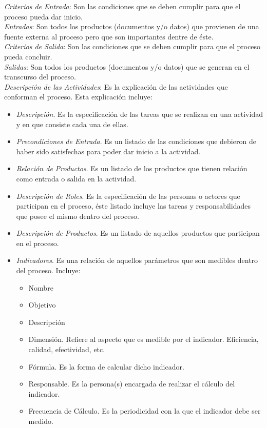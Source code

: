 \begin{footnotesize}
\textit{Criterios de Entrada}: Son las condiciones que se deben cumplir para que el proceso pueda dar inicio.\\

\textit{Entradas}: Son todos los productos (documentos y/o datos) que provienen de una fuente externa al proceso pero que son importantes dentre de éste.\\

\textit{Criterios de Salida}: Son las condiciones que se deben cumplir para que el proceso pueda concluir.\\

\textit{Salidas}: Son todos los productos (documentos y/o datos) que se generan en el transcurso del proceso.\\

\textit{Descripción de las Actividades}: Es la explicación de las actividades que conforman el proceso. Esta explicación incluye:\\

\begin{itemize}
\item \textit{Descripción}. Es la especificación de las tareas que se realizan en una actividad y en que consiste cada una de ellas.\\ 
\item \textit{Precondiciones de Entrada}. Es un listado de las condiciones que debieron de haber sido satisfechas para poder dar inicio a la actividad.\\
\item \textit{Relación de Productos}. Es un listado de los productos que tienen relación como entrada o salida en la actividad.\\
\item \textit{Descripción de Roles}. Es la especificación de las personas o actores que participan en el proceso, éste listado incluye las tareas y responsabilidades que posee el mismo dentro del proceso.\\
\item \textit{Descripción de Productos}. Es un listado de aquellos productos que participan en el proceso.\\
\item \textit{Indicadores}. Es una relación de aquellos parámetros que son medibles dentro del proceso. Incluye:\\

	\begin{itemize}
		\item Nombre
		\item Objetivo
		\item Descripción
		\item Dimensión. Refiere al aspecto que es medible por el indicador. Eficiencia, calidad, efectividad, etc.
		\item Fórmula. Es la forma de calcular dicho indicador.
		\item Responsable. Es la persona(s) encargada de realizar el cálculo del indicador.
		\item Frecuencia de Cálculo. Es la periodicidad con la que el indicador debe ser medido.
	\end{itemize}


\end{itemize}
\end{footnotesize}
